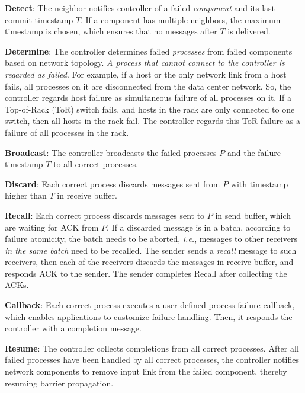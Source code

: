 \begin{ecompact}
\item \textbf{Detect}: The neighbor notifies controller of a failed \emph{component} and its last commit timestamp $T$. If a component has multiple neighbors, the maximum timestamp is chosen, which ensures that no messages after $T$ is delivered.
\item \textbf{Determine}: The controller determines failed \emph{processes} from failed components based on network topology. \emph{A process that cannot connect to the controller is regarded as failed}.
For example, if a host or the only network link from a host fails, all processes on it are disconnected from the data center network. So, the controller regards host failure as simultaneous failure of all processes on it.
If a Top-of-Rack (ToR) switch fails, and hosts in the rack are only connected to one switch, then all hosts in the rack fail. The controller regards this ToR failure as a failure of all processes in the rack.
\item \textbf{Broadcast}: The controller broadcasts the failed processes $P$ and the failure timestamp $T$ to all correct processes.
\item \textbf{Discard}: Each correct process discards messages sent from $P$ with timestamp higher than $T$ in receive buffer.
\item \textbf{Recall}: Each correct process discards messages sent to $P$ in send buffer, which are waiting for ACK from $P$. If a discarded message is in a batch, according to failure atomicity, the batch needs to be aborted, \emph{i.e.}, messages to other receivers \emph{in the same batch} need to be recalled. The sender sends a \emph{recall} message to such receivers, then each of the receivers discards the messages in receive buffer, and responds ACK to the sender. The sender completes Recall after collecting the ACKs.
\item \textbf{Callback}: Each correct process executes a user-defined process failure callback, which enables applications to customize failure handling. Then, it responds the controller with a completion message.
\item \textbf{Resume}: The controller collects completions from all correct processes.
After all failed processes have been handled by all correct processes, the controller notifies network components to remove input link from the failed component, thereby resuming barrier propagation.
\end{ecompact}

